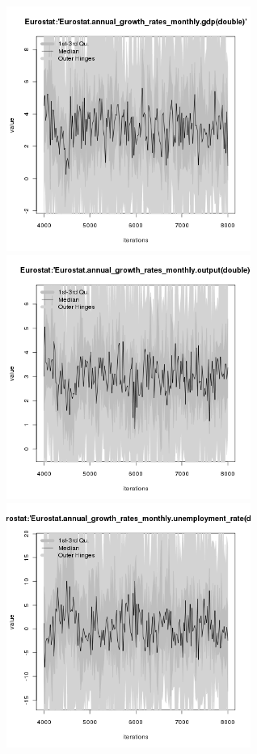 \begin{figure}[H!]
\centering\leavevmode
\begin{minipage}{17cm}
\centering\leavevmode
\includegraphics[width=8cm]{./png/tax_0.05/Eurostat-annual_growth_rates_monthly-gdp.png}
\includegraphics[width=8cm]{./png/tax_0.05/Eurostat-annual_growth_rates_monthly-output.png}\\
\includegraphics[width=8cm]{./png/tax_0.05/Eurostat-annual_growth_rates_monthly-unemployment_rate.png}

\end{minipage}
\end{figure}
